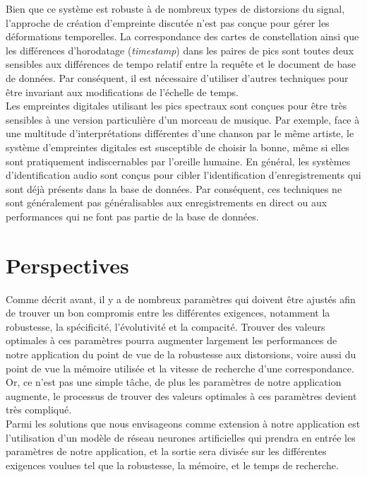 \documentclass[10pt, english]{report}
\begin{document}
\vspace{0.5cm}
Bien que ce système est robuste à de nombreux types de distorsions du signal, l'approche de création d'empreinte discutée n'est pas conçue pour gérer les déformations temporelles. La correspondance des cartes de constellation ainsi que les différences d'horodatage (\textit{timestamp}) dans les paires de pics sont toutes deux sensibles aux différences de tempo relatif entre la requête et le document de base de données. Par conséquent, il est nécessaire d'utiliser d'autres techniques pour être invariant aux modifications de l'échelle de temps.\\

Les empreintes digitales utilisant les pics spectraux sont conçues pour être très sensibles à une version particulière d'un morceau de musique. Par exemple, face à une multitude d'interprétations différentes d'une chanson par le même artiste, le système d'empreintes digitales est susceptible de choisir la bonne, même si elles sont pratiquement indiscernables par l'oreille humaine. En général, les systèmes d'identification audio sont conçus pour cibler l'identification d'enregistrements qui sont déjà présents dans la base de données. Par conséquent, ces techniques ne sont généralement pas généralisables aux enregistrements en direct ou aux performances qui ne font pas partie de la base de données.


\chapter{Perspectives}
Comme décrit avant, il y a de nombreux paramètres qui doivent être ajustés afin de trouver un bon compromis entre les différentes exigences, notamment la robustesse, la spécificité, l'évolutivité et la compacité. Trouver des valeurs optimales à ces paramètres pourra augmenter largement les performances de notre application du point de vue de la robustesse aux distorsions, voire aussi du point de vue la mémoire utilisée et la vitesse de recherche d'une correspondance. Or, ce n'est pas une simple tâche, de plus les paramètres de notre application augmente, le processus de trouver des valeurs optimales à ces paramètres devient très compliqué.\\

Parmi les solutions que nous envisageons comme extension à notre application est l'utilisation d'un modèle de réseau neurones artificielles qui prendra en entrée les paramètres de notre application, et la sortie sera divisée sur les différentes exigences voulues tel que la robustesse, la mémoire, et le temps de recherche.\\
\end{document}
